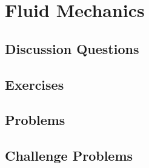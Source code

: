 
\chapter{Fluid Mechanics}

\section{Discussion Questions}

\section{Exercises}

\section{Problems}

\section{Challenge Problems}
